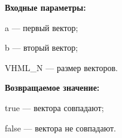 \textbf{Входные параметры:}

  a --- первый вектор;
  
 b --- вторый вектор;
 
 VHML\_N --- размер векторов.

\textbf{Возвращаемое значение:}

 true --- вектора совпадают;
 
 false --- вектора не совпадают.